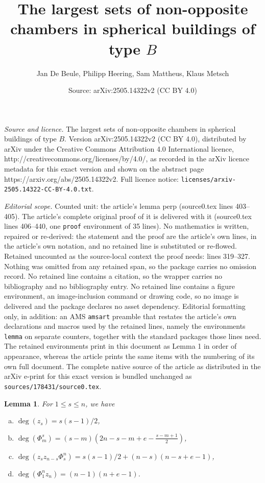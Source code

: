\documentclass[10pt,a4paper]{amsart}
\title{The largest sets of non-opposite chambers in spherical buildings of type $B$}
\author{Jan De Beule, Philipp Heering, Sam Mattheus, Klaus Metsch}
\date{Source: arXiv:2505.14322v2 (CC BY 4.0)}
\newtheorem{lemma}{Lemma}
\renewcommand{\leq}{\leqslant}
\begin{document}
\maketitle

\noindent\emph{Source and licence.} The largest sets of non-opposite chambers in spherical buildings of type $B$. Version arXiv:2505.14322v2 (CC BY 4.0), distributed by arXiv under the Creative Commons Attribution 4.0 International licence, http://creativecommons.org/licenses/by/4.0/, as recorded in the arXiv licence metadata for this exact version and shown on the abstract page https://arxiv.org/abs/2505.14322v2. Full licence notice: \texttt{licenses/arxiv-2505.14322-CC-BY-4.0.txt}.\par\smallskip

\noindent\textit{Editorial scope.} Counted unit: the article's lemma perp (source0.tex lines 403--405). The article's complete original proof of it is delivered with it (source0.tex lines 406--440, one \texttt{proof} environment of 35 lines). No mathematics is written, repaired or re-derived: the statement and the proof are the article's own lines, in the article's own notation, and no retained line is substituted or re-flowed.  Retained uncounted as the source-local context the proof needs: lines 319--327.  Nothing was omitted from any retained span, so the package carries no omission record.  No retained line contains a citation, so the wrapper carries no bibliography and no bibliography entry.  No retained line contains a figure environment, an image-inclusion command or drawing code, so no image is delivered and the package declares no asset dependency.  Editorial formatting only, in addition: an AMS \texttt{amsart} preamble that restates the article's own declarations and macros used by the retained lines, namely the environments \texttt{lemma} on separate counters, together with the standard packages those lines need.  The retained environments print in this document as Lemma 1 in order of appearance, whereas the article prints the same items with the numbering of its own full document.  The complete native source of the article as distributed in the arXiv e-print for this exact version is bundled unchanged as \texttt{sources/178431/source0.tex}.
\begin{lemma} \label{L:degree_stuff}
For $1\leq s\leq n$, we have
    \begin{enumerate} [(a)]
        \item $\deg(z_s)=s(s-1)/2$,
        \item $\deg(\Phi_m^s)=(s-m)(2n-s-m+e-\frac{s-m+1}{2})$,
        \item $\deg(z_sz_{n-s}\Phi_s^n)=s(s-1)/2+(n-s)(n-s+e-1)$,
        \item $\deg(\Phi_1^nz_n)=(n-1)(n+e-1)$.
    \end{enumerate}
\end{lemma}
\end{document}
